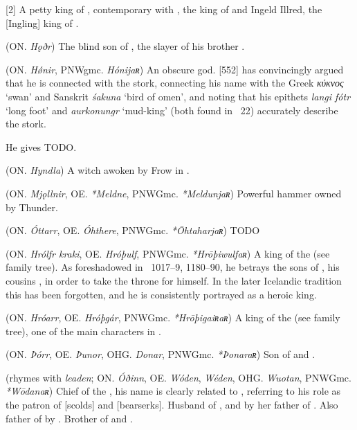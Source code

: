 \begin{itemize}
[2]
  A petty king of , contemporary with , the king of  and Ingeld Illred, the [Ingling] king of .

 (ON. \emph{Hǫðr})
  The blind son of , the slayer of his brother .

 (ON. \emph{Hǿnir}, PNWgmc. \emph{Hónijaʀ})
  An obscure god. \textcite{Rydberg1886}[552] has convincingly argued that he is connected with the stork, connecting his name with the Greek \emph{κύκνος} ‘swan’ and Sanskrit \emph{śakuna} ‘bird of omen’, and noting that his epithets \emph{langi fótr} ‘long foot’ and \emph{aurkonungr} ‘mud-king’ (both found in \Skaldskaparmal\ 22) accurately describe the stork.

  He gives  TODO.

 (ON. \emph{Hyndla}) A witch awoken by Frow in \Hyndluljod.

 (ON. \emph{Mjǫllnir}, OE. \emph{*Meldne}, PNWGmc. \emph{*Meldunjaʀ})
  Powerful hammer owned by Thunder.

 (ON. \emph{Óttarr}, OE. \emph{Óhthere}, PNWGmc. \emph{*Ōhtaharjaʀ})
  TODO

 (ON. \emph{Hrólfr kraki}, OE. \emph{Hróþulf}, PNWGmc. \emph{*Hrōþiwulfaʀ})
  A king of the  (see family tree). As foreshadowed in \Beowulf\ 1017–9, 1180–90, he betrays the sons of , his cousins , in order to take the throne for himself. In the later Icelandic tradition this has been forgotten, and he is consistently portrayed as a heroic king.

 (ON. \emph{Hróarr}, OE. \emph{Hróþgár}, PNWGmc. \emph{*Hrōþigaiʀaʀ})
  A king of the  (see family tree), one of the main characters in \Beowulf.

 (ON. \emph{Þórr}, OE. \emph{Þunor}, OHG. \emph{Donar}, PNWGmc. \emph{*Þonaraʀ})
  Son of  and .

 (rhymes with \emph{leaden}; ON. \emph{Óðinn}, OE. \emph{Wóden}, \emph{Wéden}, OHG. \emph{Wuotan}, PNWGmc. \emph{*Wōdanaʀ})
  Chief of the , his name is clearly related to , referring to his role as the patron of [scolds] and [bearserks]. Husband of , and by her father of . Also father of  by . Brother of  and .


\end{itemize}

